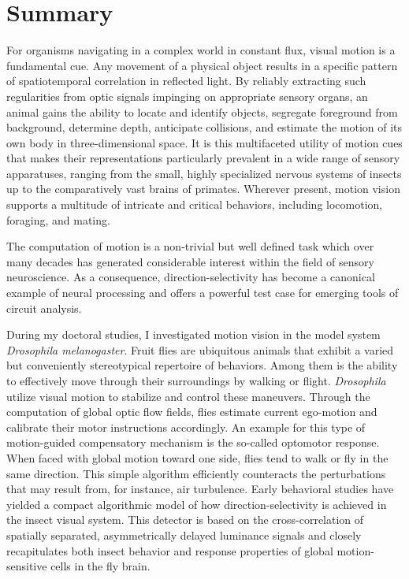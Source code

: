 
\chapter*{Summary}
\label{chp:summary}

For organisms navigating in a complex world in constant flux, visual motion is a fundamental cue. Any movement of a physical object results in a specific pattern of spatiotemporal correlation in reflected light. By reliably extracting such regularities from optic signals impinging on appropriate sensory organs, an animal gains the ability to locate and identify objects, segregate foreground from background, determine depth, anticipate collisions, and estimate the motion of its own body in three-dimensional space. It is this multifaceted utility of motion cues that makes their representations particularly prevalent in a wide range of sensory apparatuses, ranging from the small, highly specialized nervous systems of insects up to the comparatively vast brains of primates. Wherever present, motion vision supports a multitude of intricate and critical behaviors, including locomotion, foraging, and mating.

The computation of motion is a non-trivial but well defined task which over many decades has generated considerable interest within the field of sensory neuroscience. As a consequence, direction-selectivity has become a canonical example of neural processing and offers a powerful test case for emerging tools of circuit analysis.

During my doctoral studies, I investigated motion vision in the model system \textit{Drosophila melanogaster}. Fruit flies are ubiquitous animals that exhibit a varied but conveniently stereotypical repertoire of behaviors. Among them is the ability to effectively move through their surroundings by walking or flight. \textit{Drosophila} utilize visual motion to stabilize and control these maneuvers. Through the computation of global optic flow fields, flies estimate current ego-motion and calibrate their motor instructions accordingly. An example for this type of motion-guided compensatory mechanism is the so-called optomotor response. When faced with global motion toward one side, flies tend to walk or fly in the same direction. This simple algorithm efficiently counteracts the perturbations that may result from, for instance, air turbulence. Early behavioral studies have yielded a compact algorithmic model of how direction-selectivity is achieved in the insect visual system. This detector is based on the cross-correlation of spatially separated, asymmetrically delayed luminance signals and closely recapitulates both insect behavior and response properties of global motion-sensitive cells in the fly brain.

